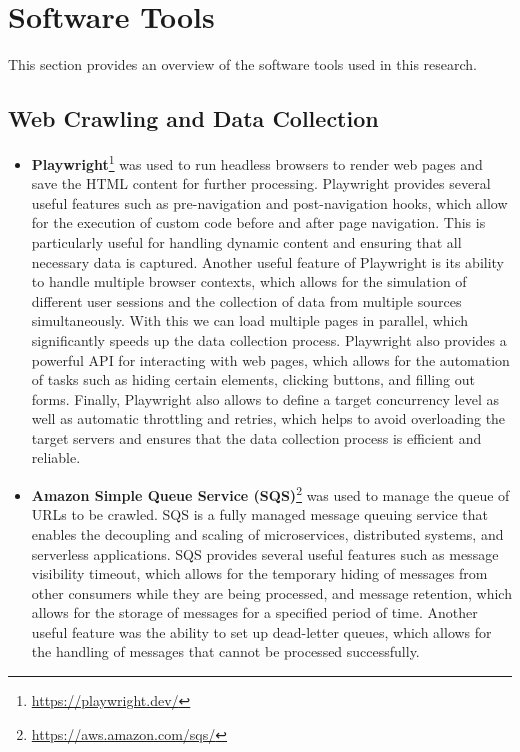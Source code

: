 \section{Software Tools}\label{sec:software_tools}

This section provides an overview of the software tools used in this research.

\subsection{Web Crawling and Data Collection}\label{subsec:web-crawling-and-data-collection}

\begin{itemize}
    \item \textbf{Playwright}\footnote{\url{https://playwright.dev/}} was used to run headless browsers to render web pages and save the HTML content for further processing.
    Playwright provides several useful features such as pre-navigation and post-navigation hooks, which allow for the execution of custom code before and after page navigation.
    This is particularly useful for handling dynamic content and ensuring that all necessary data is captured.
    Another useful feature of Playwright is its ability to handle multiple browser contexts, which allows for the simulation of different user sessions and the collection of data from multiple sources simultaneously.
    With this we can load multiple pages in parallel, which significantly speeds up the data collection process.
    Playwright also provides a powerful API for interacting with web pages, which allows for the automation of tasks such as hiding certain elements, clicking buttons, and filling out forms.
    Finally, Playwright also allows to define a target concurrency level as well as automatic throttling and retries, which helps to avoid overloading the target servers and ensures that the data collection process is efficient and reliable.

    \item \textbf{Amazon Simple Queue Service (SQS)}\footnote{\url{https://aws.amazon.com/sqs/}} was used to manage the queue of URLs to be crawled.
    SQS is a fully managed message queuing service that enables the decoupling and scaling of microservices, distributed systems, and serverless applications.
    SQS provides several useful features such as message visibility timeout, which allows for the temporary hiding of messages from other consumers while they are being processed, and message retention, which allows for the storage of messages for a specified period of time.
    Another useful feature was the ability to set up dead-letter queues, which allows for the handling of messages that cannot be processed successfully.
\end{itemize}

